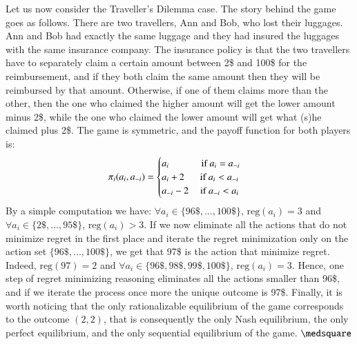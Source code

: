 \documentclass[fleqn,reqno,11pt]{article}
\begin{document}
\begin{example}
Let us now consider the Traveller's Dilemma case. The story behind the game goes as
follows. There are two travellers, Ann and Bob, who lost their luggages. Ann and Bob had
exactly the same luggage and they had insured the luggages with the same insurance company. The
insurance policy is that the two travellers have to separately claim a certain amount between
2\$ and 100\$ for the reimbursement, and if they both claim the same amount then they will be
reimbursed by that amount. Otherwise, if one of them claims more than the other, then the one
who claimed the higher amount will get the lower amount minus 2\$, while the one who claimed
the lower amount will get what (s)he claimed plus 2\$. The game is symmetric, and the payoff
function for both players is:
\begin{align*}
  \pi_i(a_i,a_{-i}) = \begin{cases} a_i \text{ \hspace{1cm} if } a_i = a_{-i} \\ a_i + 2 \text{
      \hspace{.4cm} if } a_i < a_{-i} \\ a_{-i} -2 \text{ \hspace{.25cm} if } a_{-i} <
    a_i \end{cases}
\end{align*}
By a simple computation we have:  $\forall a_i \in \lbrace 96\$, ..., 100\$ \rbrace \text{, } \text{reg}(a_i)=3 $ and $\forall a_i \in \lbrace 2\$, ..., 95\$ \rbrace \text{, } \text{reg}(a_i)>3$. If we now eliminate all the actions that do not minimize regret in the first place and iterate the regret minimization only on the action set $\lbrace 96\$, ..., 100\$ \rbrace$, we get that 97\$ is the action that minimize regret. Indeed, $\text{reg}(97)=2$ and $\forall a_i \in \lbrace 96\$, 98\$, 99\$, 100\$ \rbrace \text{, } \text{reg}(a_i)=3 $. Hence, one step of regret minimizing reasoning eliminates all the actions smaller than 96\$, and if we iterate the process once more the unique outcome is 97\$. Finally, it is worth noticing that the only rationalizable equilibrium of the game corresponds to the outcome $(2,2)$, that is consequently the only Nash equilibrium, the only perfect equilibrium, and the only sequential equilibrium of the game. $ \medsquare $
  
\end{example}

\end{document}

